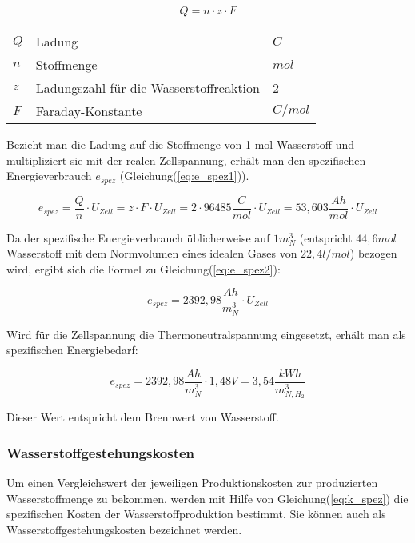 \documentclass[onecolumn,10pt,titlepage]{article}
\begin{document}
		\begin{equation}
		\label{eq:Q}
		Q=n\cdot z \cdot F
		\end{equation}
		
		\begin{table}[H]
			\begin{tabular*}{\textwidth}{lll}
				$Q$&Ladung&$C$\\
				$n$&Stoffmenge&$mol$\\
				$z$&Ladungszahl für die Wasserstoffreaktion & 2\\
				$F$&Faraday-Konstante&$C/mol$
			\end{tabular*}
		\end{table}
		
		Bezieht man die Ladung auf die Stoffmenge von 1 mol Wasserstoff und multipliziert sie mit der realen Zellspannung, erhält man den spezifischen Energieverbrauch $e_{spez}$ (Gleichung(\ref{eq:e_spez1})).\cite{Bayer.2000}
		
		\begin{equation}
		\label{eq:e_spez1}
		e_{spez} = \frac{Q}{n}\cdot U_{Zell}=z\cdot F\cdot U_{Zell}=2\cdot 96485 \frac{C}{mol}\cdot U_{Zell} = 53,603 \dfrac{Ah}{mol}\cdot U_{Zell}
		\end{equation}
			
			Da der spezifische Energieverbrauch üblicherweise auf $1 m^3_N$ (entspricht $44,6 mol$ Wasserstoff mit dem Normvolumen eines idealen Gases von $22,4 l/mol$) bezogen wird, ergibt sich die Formel zu Gleichung(\ref{eq:e_spez2}):
			
			\begin{equation}
			\label{eq:e_spez2}
			e_{spez} = 2392,98\frac{Ah}{m^3_N}\cdot U_{Zell}
			\end{equation}
			
			Wird für die Zellspannung die Thermoneutralspannung eingesetzt, erhält man als spezifischen Energiebedarf:
			
			\begin{equation}
			\label{eq:e_spez3}
			e_{spez} = 2392,98\frac{Ah}{m^3_N}\cdot 1,48V=3,54\frac{kWh}{m^3_{N,H_2}}
			\end{equation}
			
			Dieser Wert entspricht dem Brennwert von Wasserstoff.
			
			\subsubsection*{Wasserstoffgestehungskosten}
			Um einen Vergleichswert der jeweiligen Produktionskosten zur produzierten Wasserstoffmenge zu bekommen, werden mit Hilfe von Gleichung(\ref{eq:k_spez}) die spezifischen Kosten der Wasserstoffproduktion bestimmt. Sie können auch als Wasserstoffgestehungskosten bezeichnet werden.
			
\end{document}

